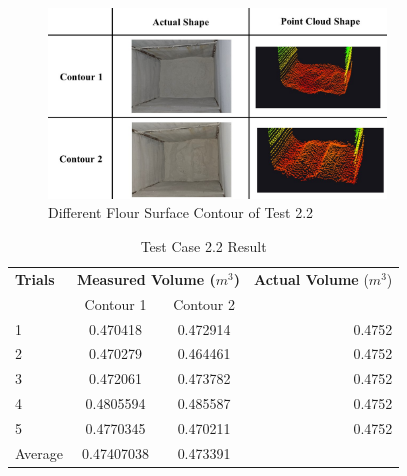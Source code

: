 \begin{figure}[H]
	\centering
	\includegraphics[width=0.8\textwidth]{Figures/test_2-2_contours}
	\caption{Different Flour Surface Contour of Test 2.2}
	\label{ch4:fig:test_2-2_contours}
\end{figure}
\begin{table}[H]
	\centering
	\caption{Test Case 2.2 Result}
	\label{table:test_case_2-2_results}
	\begin{tabular}{l c c r}
		\toprule
		\textbf{Trials} & \multicolumn{2}{c}{\textbf{Measured Volume ($m^{3}$)}} & \textbf{Actual Volume} ($m^{3}$)          \\
		{}              & Contour 1                                              & Contour 2                        & {}     \\ \midrule
		1               & 0.470418                                               & 0.472914                         & 0.4752 \\
		2               & 0.470279                                               & 0.464461                         & 0.4752 \\
		3               & 0.472061                                               & 0.473782                         & 0.4752 \\
		4               & 0.4805594                                              & 0.485587                         & 0.4752 \\
		5               & 0.4770345                                              & 0.470211                         & 0.4752 \\ \midrule
		Average         & 0.47407038                                             & 0.473391                         & {}     \\ \bottomrule
	\end{tabular}
\end{table}

